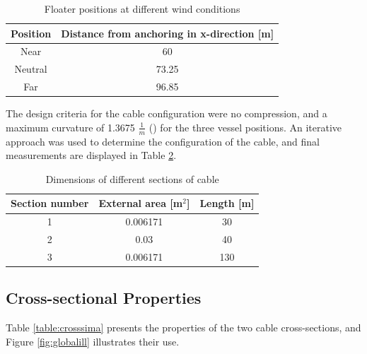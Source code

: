 \begin{table} [H]
\centering
\begin{tabular}{ |c|c|}
\hline
Position & Distance from anchoring in x-direction [m] \\
 \hline
 \hline
 
Near & 60\\

Neutral & 73.25\\

Far & 96.85 \\
 
 \hline
\end{tabular}
\caption{Floater positions at different wind conditions}
\label{table:pos}
\end{table}

The design criteria for the cable configuration were no compression, and a maximum curvature of 1.3675 $\frac{1}{m}$ (\cite{API2014}) for the three vessel positions. An iterative approach was used to determine the configuration of the cable, and final measurements are displayed in Table \ref{table:DIMCABLE}.
\begin{table} [H]
\centering
\begin{tabular}{ |c|c|c|}
\hline
Section number & External area [m$^2$] & Length [m] \\
 \hline
 \hline
1 & 0.006171 & 30\\
2 & 0.03 & 40\\
3 & 0.006171 & 130\\
 \hline
\end{tabular}
\caption{Dimensions of different sections of cable}
\label{table:DIMCABLE}
\end{table}

\subsection{Cross-sectional Properties}
 Table \ref{table:crosssima} presents the properties of the two cable cross-sections, and Figure \ref{fig:globalill} illustrates their use.

